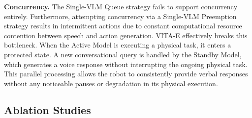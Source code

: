 \textbf{Concurrency.} The Single-VLM Queue strategy fails to support concurrency entirely. Furthermore, attempting concurrency via a Single-VLM Preemption strategy results in intermittent actions due to constant computational resource contention between speech and action generation. VITA-E effectively breaks this bottleneck. When the Active Model is executing a physical task, it enters a protected state. A new conversational query is handled by the Standby Model, which generates a voice response without interrupting the ongoing physical task. This parallel processing allows the robot to consistently provide verbal responses without any noticeable pauses or degradation in its physical execution.

\begin{table}[!t]
    \centering
    \caption{Performance Comparison in Interruption and Concurrency Scenarios}
    \label{tab:scenario_comparison}
\end{table}

\subsection{Ablation Studies}

